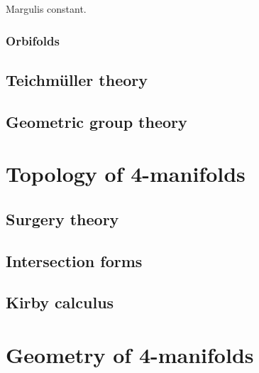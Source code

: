 \documentclass{../note}
\begin{document}
\begin{prb}
\end{prb}

\begin{prb}
Margulis constant.
\end{prb}

\begin{prb}
\end{prb}


\section{Orbifolds}




\chapter{Teichm\"uller theory}
\section{}

\chapter{Geometric group theory}
\section{}


\part{Topology of 4-manifolds}
\chapter{Surgery theory}
\chapter{Intersection forms}
\chapter{Kirby calculus}


\part{Geometry of 4-manifolds}
\chapter{}
\chapter{}
\chapter{}
\end{document}
